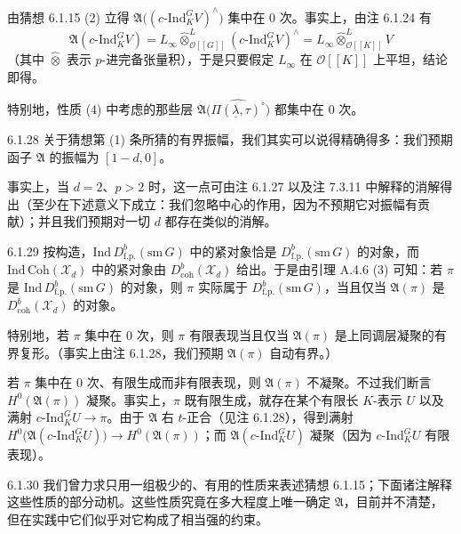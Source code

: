 由猜想 6.1.15 (2) 立得 $\mathfrak A\bigl((c\text{-}\mathrm{Ind}_K^G V)^\wedge\bigr)$ 集中在 0 次。事实上，由注 6.1.24 有
\[
\mathfrak A(c\text{-}\mathrm{Ind}_K^G V)
=L_\infty\widehat{\otimes}^L_{\mathcal O[[G]]}(c\text{-}\mathrm{Ind}_K^G V)^\wedge
=L_\infty\widehat{\otimes}^L_{\mathcal O[[K]]}V
\]
（其中 $\widehat{\otimes}$ 表示 $p$-进完备张量积），于是只要假定 $L_\infty$ 在 $\mathcal O[[K]]$ 上平坦，结论即得。

特别地，性质 (4) 中考虑的那些层 $\mathfrak A\bigl(\widehat{\Pi(\underline\lambda,\tau)^\circ}\bigr)$ 都集中在 0 次。

\begin{rem}{6.1.28}
关于猜想第 (1) 条所猜的有界振幅，我们其实可以说得精确得多：我们预期函子 $\mathfrak A$ 的振幅为 $[1-d,0]$。

事实上，当 $d=2$、$p>2$ 时，这一点可由注 6.1.27 以及注 7.3.11 中解释的消解得出（至少在下述意义下成立：我们忽略中心的作用，因为不预期它对振幅有贡献）；并且我们预期对一切 $d$ 都存在类似的消解。
\end{rem}

\begin{rem}{6.1.29}
按构造，$\mathrm{Ind}\,D^b_{\mathrm{f.p.}}(\mathrm{sm}\,G)$ 中的紧对象恰是 $D^b_{\mathrm{f.p.}}(\mathrm{sm}\,G)$ 的对象，而 $\mathrm{Ind}\,\mathrm{Coh}(\mathcal X_d)$ 中的紧对象由 $D^b_{\mathrm{coh}}(\mathcal X_d)$ 给出。于是由引理 A.4.6 (3) 可知：若 $\pi$ 是 $\mathrm{Ind}\,D^b_{\mathrm{f.p.}}(\mathrm{sm}\,G)$ 的对象，则 $\pi$ 实际属于 $D^b_{\mathrm{f.p.}}(\mathrm{sm}\,G)$，当且仅当 $\mathfrak A(\pi)$ 是 $D^b_{\mathrm{coh}}(\mathcal X_d)$ 的对象。

特别地，若 $\pi$ 集中在 0 次，则 $\pi$ 有限表现当且仅当 $\mathfrak A(\pi)$ 是上同调层凝聚的有界复形。（事实上由注 6.1.28，我们预期 $\mathfrak A(\pi)$ 自动有界。）

若 $\pi$ 集中在 0 次、有限生成而非有限表现，则 $\mathfrak A(\pi)$ 不凝聚。不过我们断言 $H^0(\mathfrak A(\pi))$ 凝聚。事实上，$\pi$ 既有限生成，就存在某个有限长 $K$-表示 $U$ 以及满射 $c\text{-}\mathrm{Ind}_K^G U\to\pi$。由于 $\mathfrak A$ 右 $t$-正合（见注 6.1.28），得到满射 $H^0\bigl(\mathfrak A(c\text{-}\mathrm{Ind}_K^G U)\bigr)\to H^0(\mathfrak A(\pi))$；而 $\mathfrak A(c\text{-}\mathrm{Ind}_K^G U)$ 凝聚（因为 $c\text{-}\mathrm{Ind}_K^G U$ 有限表现）。
\end{rem}

\begin{rem}{6.1.30}
我们曾力求只用一组极少的、有用的性质来表述猜想 6.1.15；下面诸注解释这些性质的部分动机。这些性质究竟在多大程度上唯一确定 $\mathfrak A$，目前并不清楚，但在实践中它们似乎对它构成了相当强的约束。
\end{rem}

